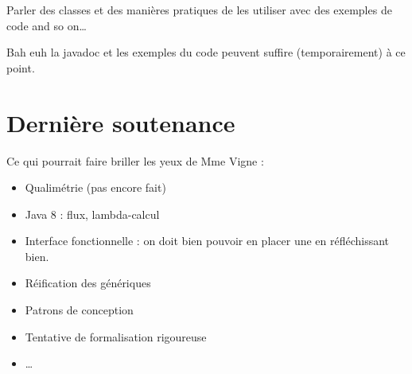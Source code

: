 \documentclass[11pt]{article}
\begin{document}
Parler des classes et des manières \og pratiques \fg{} de les utiliser avec des exemples de code and so on…

Bah euh la javadoc et les exemples du code peuvent suffire (temporairement) à ce point.

\section{Dernière soutenance}

Ce qui pourrait faire briller les yeux de Mme Vigne :
\begin{itemize}
\item Qualimétrie (pas encore fait)
\item Java 8 : flux, lambda-calcul
\item Interface fonctionnelle : on doit bien pouvoir en placer une en réfléchissant bien.
\item Réification des génériques
\item Patrons de conception
\item Tentative de formalisation rigoureuse
\item …
\end{itemize}
\end{document}
